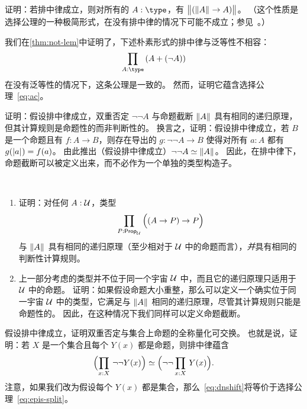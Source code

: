 \begin{ex}\label{ex:lem-impl-simple-ac}
  证明：若排中律成立，则对所有的 $A:\type$，有 $\bigl\Vert (\mathopen{}\left\Vert A\right\Vert_{}\mathclose{} \to A)\bigr\Vert_{}$。
  （这个性质是选择公理的一种极简形式，在没有排中律的情况下可能不成立；参见~\cite{krausgeneralizations}。）
\end{ex}

\begin{ex}\label{ex:naive-lem-impl-ac}
  我们在\cref{thm:not-lem}中证明了，下述朴素形式的排中律与泛等性不相容：
  \[ \prd{A:\type} (A+(\neg A)) \]
  在没有泛等性的情况下，这条公理是一致的。
  然而，证明它蕴含选择公理~\eqref{eq:ac}。
\end{ex}

\begin{ex}\label{ex:lem-brck}
  证明：假设排中律成立，双重否定 $\neg \neg A$ 与命题截断 $\mathopen{}\left\Vert A\right\Vert_{}\mathclose{}$ 具有相同的递归原理，但其计算规则是命题性的而非判断性的。
  换言之，证明：假设排中律成立，若 $B$ 是一个命题且有 $f:A\to B$，则存在导出的 $g:\neg\neg A \to B$ 使得对所有 $a:A$ 都有 $g(\mathopen{}\left|a\right|_{}^{}\mathclose{}) = f(a)$。
  由此推出（假设排中律成立）$\neg\neg A \simeq \mathopen{}\left\Vert A\right\Vert_{}\mathclose{}$。
  因此，在排中律下，命题截断可以被定义出来，而不必作为一个单独的类型构造子。
\end{ex}

\begin{ex}\label{ex:impred-brck}\ 
  \begin{enumerate}
  \item 证明：对任何 $A : \mathcal{U}$，类型
    \[\prd{P:\prop_{\UU}} \Parens{(A\to P)\to P}\]
    与 $\mathopen{}\left\Vert A\right\Vert_{}\mathclose{}$ 具有相同的递归原理（至少相对于 $\mathcal{U}$ 中的命题而言），\emph{并}具有相同的判断性计算规则。
  \item 上一部分考虑的类型并不位于同一个宇宙 $\mathcal{U}$ 中，而且它的递归原理只适用于 $\mathcal{U}$ 中的命题。
    证明：如果假设命题大小重整，那么可以定义一个确实位于同一宇宙 $\mathcal{U}$ 中的类型，它满足与 $\mathopen{}\left\Vert A\right\Vert_{}\mathclose{}$ 相同的递归原理，尽管其计算规则只能是命题性的。
    因此，在这种情况下我们同样可以定义命题截断。
  \end{enumerate}
\end{ex}

\begin{ex}\label{ex:lem-impl-dn-commutes}
  假设排中律成立，证明双重否定与集合上命题的全称量化可交换。
  也就是说，证明：若 $X$ 是一个集合且每个 $Y(x)$ 都是命题，则排中律蕴含
  \begin{equation}
    \eqv{\Parens{\prd{x:X} \neg\neg Y(x)}}{\Parens{\neg\neg \prd{x:X} Y(x)}}.\label{eq:dnshift}
  \end{equation}
  注意，如果我们改为假设每个 $Y(x)$ 都是集合，那么~\eqref{eq:dnshift}将等价于选择公理~\eqref{eq:epis-split}。
\end{ex}

